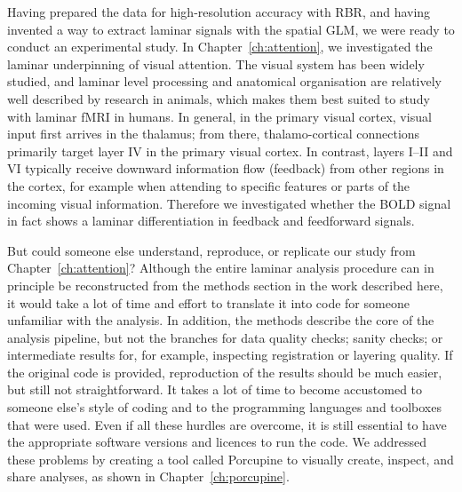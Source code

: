 Having prepared the data for high-resolution accuracy with RBR, and having invented a way to extract laminar signals with the spatial GLM, we were ready to conduct an experimental study. In Chapter~\ref{ch:attention}, we investigated the laminar underpinning of visual attention. The visual system has been widely studied, and laminar level processing and anatomical organisation are relatively well described by research in animals, which makes them best suited to study with laminar fMRI in humans. In general, in the primary visual cortex, visual input first arrives in the thalamus; from there, thalamo-cortical connections primarily target layer IV in the primary visual cortex. In contrast, layers I–II and VI typically receive downward information flow (feedback) from other regions in the cortex, for example when attending to specific features or parts of the incoming visual information. Therefore we investigated whether the BOLD signal in fact shows a laminar differentiation in feedback and feedforward signals.

But could someone else understand, reproduce, or replicate our study from Chapter~\ref{ch:attention}? Although the entire laminar analysis procedure can in principle be reconstructed from the methods section in the work described here, it would take a lot of time and effort to translate it into code for someone unfamiliar with the analysis. In addition, the methods describe the core of the analysis pipeline, but not the branches for data quality checks; sanity checks; or intermediate results for, for example, inspecting registration or layering quality. If the original code is provided, reproduction of the results should be much easier, but still not straightforward. It takes a lot of time to become accustomed to someone else’s style of coding and to the programming languages and toolboxes that were used. Even if all these hurdles are overcome, it is still essential to have the appropriate software versions and licences to run the code. We addressed these problems by creating a tool called Porcupine to visually create, inspect, and share analyses, as shown in Chapter~\ref{ch:porcupine}.

